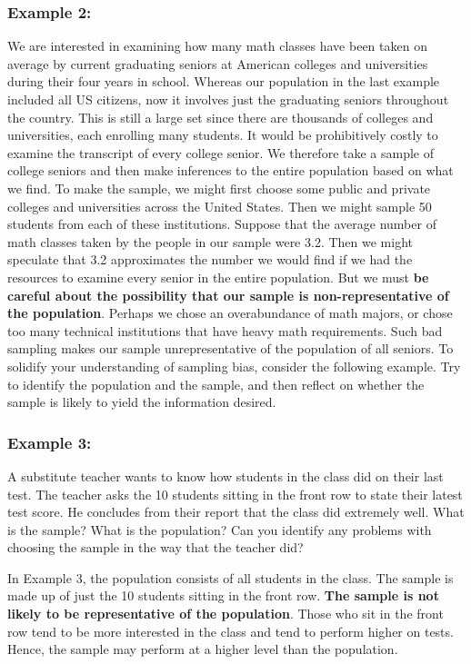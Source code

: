 {	\subsubsection{Example 2:} We are interested in examining how many math classes have
	been taken on average by current graduating seniors at American colleges
	and universities during their four years in school. Whereas our population in
	the last example included all US citizens, now it involves just the graduating
	seniors throughout the country. This is still a large set since there are
	thousands of colleges and universities, each enrolling many students. It would be
	prohibitively costly to examine the transcript of every college senior. We
	therefore take a sample of college seniors and then make inferences to the
	entire population based on what we find. To make the sample, we might first
	choose some public and private colleges and universities across the United
	States. Then we might sample 50 students from each of these institutions.
	Suppose that the average number of math classes taken by the people in our
	sample were 3.2. Then we might speculate that 3.2 approximates the number
	we would find if we had the resources to examine every senior in the entire
	population. But we must \textbf{be careful about the possibility that our sample is
		non-representative of the population}. Perhaps we chose an overabundance of
	math majors, or chose too many technical institutions that have heavy math
	requirements. Such bad sampling makes our sample unrepresentative of the
	population of all seniors.
	To solidify your understanding of sampling bias, consider the following
	example. Try to identify the population and the sample, and then reflect on
	whether the sample is likely to yield the information desired.
	
	\subsubsection{Example 3:} A substitute teacher wants to know how students in the class
	did on their last test. The teacher asks the 10 students sitting in the front row
	to state their latest test score. He concludes from their report that the class
	did extremely well. What is the sample? What is the population? Can you
	identify any problems with choosing the sample in the way that the teacher
	did?
	
	In Example 3, the population consists of all students in the class. The sample is
	made up of just the 10 students sitting in the front row. \textbf{The sample is not likely to
		be representative of the population}. Those who sit in the front row tend to be more
	interested in the class and tend to perform higher on tests. Hence, the sample may
	perform at a higher level than the population.
	
}
